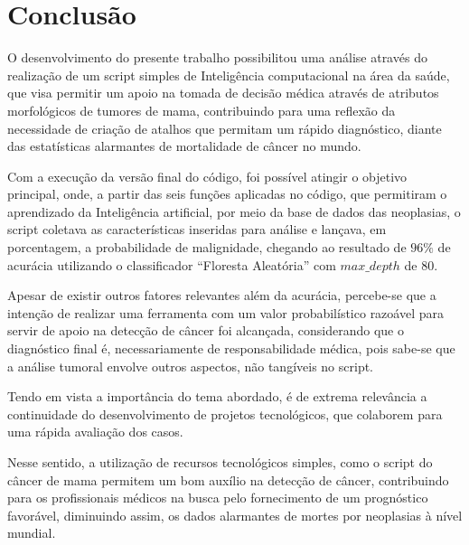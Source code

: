 \chapter{Conclusão}
\label{chapter:conclusao}

O desenvolvimento do presente trabalho possibilitou uma análise através do realização de um script simples de Inteligência computacional
na área da saúde, que visa permitir um apoio na tomada de decisão médica através de atributos morfológicos de tumores de mama,
contribuindo para uma reflexão da necessidade de criação de atalhos que permitam um rápido diagnóstico,
diante das estatísticas alarmantes de mortalidade de câncer no mundo.

Com a execução da versão final do código, foi possível atingir o objetivo principal,
onde, a partir das seis funções aplicadas no código, que permitiram o aprendizado da Inteligência artificial,
por meio da base de dados das neoplasias, o script coletava as características inseridas para análise e lançava, em porcentagem,
a probabilidade de malignidade,
chegando ao resultado de $96\%$ de acurácia
utilizando o classificador ``Floresta Aleatória'' com $max\_depth$ de $80$.


Apesar de existir outros fatores relevantes além da acurácia,
percebe-se que a intenção de realizar uma ferramenta com um valor probabilístico razoável para servir de apoio na detecção de câncer foi alcançada,
considerando que o diagnóstico final é, necessariamente de responsabilidade médica,
pois sabe-se que a análise tumoral envolve outros aspectos, não tangíveis no script.

Tendo em vista a importância do tema abordado, é de extrema relevância a continuidade do desenvolvimento de projetos tecnológicos,
que colaborem para uma rápida avaliação dos casos.

Nesse sentido, a utilização de recursos tecnológicos simples, como o script do câncer de mama permitem um bom auxílio na detecção de câncer,
contribuindo para os profissionais médicos na busca pelo fornecimento de um prognóstico favorável,
diminuindo assim, os dados alarmantes de mortes por neoplasias à nível mundial.
